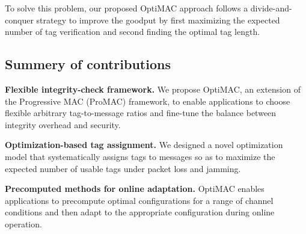 
To solve this problem, our proposed OptiMAC approach follows a divide-and-conquer strategy to improve the goodput by first maximizing the expected number of tag verification and second finding the optimal tag length. 



\subsection*{Summery of contributions}

\textbf{Flexible integrity-check framework.} We propose OptiMAC, an extension of the Progressive MAC (ProMAC) framework, to enable applications to choose flexible arbitrary tag-to-message ratios and fine-tune the balance between integrity overhead and security.

\textbf{Optimization-based tag assignment.} We designed a novel optimization model that systematically assigns tags to messages so as to maximize the expected number of usable tags under packet loss and jamming. 

\textbf{Precomputed methods for online adaptation.}
OptiMAC enables applications to precompute optimal configurations for a range of channel conditions and then adapt to the appropriate configuration during online operation.


